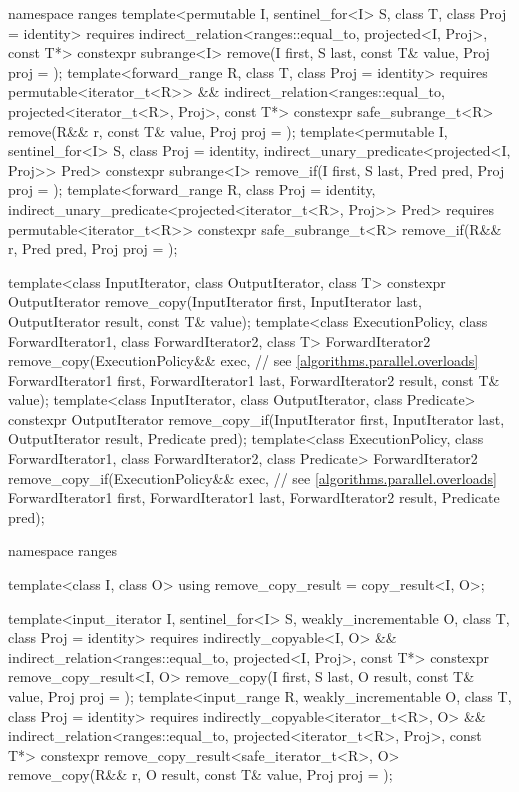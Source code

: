 \begin{codeblock}
{  namespace ranges {
    template<permutable I, sentinel_for<I> S, class T, class Proj = identity>
      requires indirect_relation<ranges::equal_to, projected<I, Proj>, const T*>
      constexpr subrange<I> remove(I first, S last, const T& value, Proj proj = {});
    template<forward_range R, class T, class Proj = identity>
      requires permutable<iterator_t<R>> &&
               indirect_relation<ranges::equal_to, projected<iterator_t<R>, Proj>, const T*>
      constexpr safe_subrange_t<R>
        remove(R&& r, const T& value, Proj proj = {});
    template<permutable I, sentinel_for<I> S, class Proj = identity,
             indirect_unary_predicate<projected<I, Proj>> Pred>
      constexpr subrange<I> remove_if(I first, S last, Pred pred, Proj proj = {});
    template<forward_range R, class Proj = identity,
             indirect_unary_predicate<projected<iterator_t<R>, Proj>> Pred>
      requires permutable<iterator_t<R>>
      constexpr safe_subrange_t<R>
        remove_if(R&& r, Pred pred, Proj proj = {});
  }

  template<class InputIterator, class OutputIterator, class T>
    constexpr OutputIterator
      remove_copy(InputIterator first, InputIterator last,
                  OutputIterator result, const T& value);
  template<class ExecutionPolicy, class ForwardIterator1, class ForwardIterator2,
           class T>
    ForwardIterator2
      remove_copy(ExecutionPolicy&& exec,                       // see \ref{algorithms.parallel.overloads}
                  ForwardIterator1 first, ForwardIterator1 last,
                  ForwardIterator2 result, const T& value);
  template<class InputIterator, class OutputIterator, class Predicate>
    constexpr OutputIterator
      remove_copy_if(InputIterator first, InputIterator last,
                     OutputIterator result, Predicate pred);
  template<class ExecutionPolicy, class ForwardIterator1, class ForwardIterator2,
           class Predicate>
    ForwardIterator2
      remove_copy_if(ExecutionPolicy&& exec,                    // see \ref{algorithms.parallel.overloads}
                     ForwardIterator1 first, ForwardIterator1 last,
                     ForwardIterator2 result, Predicate pred);

  namespace ranges {
    template<class I, class O>
    using remove_copy_result = copy_result<I, O>;

    template<input_iterator I, sentinel_for<I> S, weakly_incrementable O, class T,
             class Proj = identity>
      requires indirectly_copyable<I, O> &&
               indirect_relation<ranges::equal_to, projected<I, Proj>, const T*>
      constexpr remove_copy_result<I, O>
        remove_copy(I first, S last, O result, const T& value, Proj proj = {});
    template<input_range R, weakly_incrementable O, class T, class Proj = identity>
      requires indirectly_copyable<iterator_t<R>, O> &&
               indirect_relation<ranges::equal_to, projected<iterator_t<R>, Proj>, const T*>
      constexpr remove_copy_result<safe_iterator_t<R>, O>
        remove_copy(R&& r, O result, const T& value, Proj proj = {});

}}
\end{codeblock}
